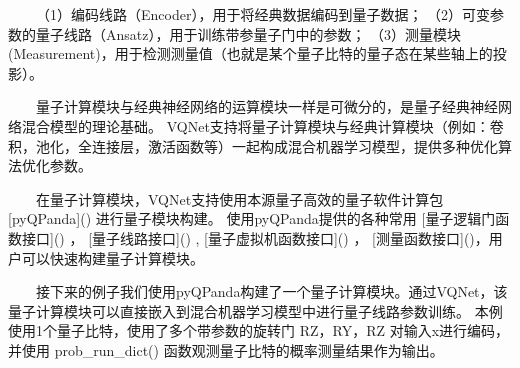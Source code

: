 \documentclass[a4paper,11pt,english]{sphinxmanual}
\let\sphinxpxdimen\pdfpxdimen\else\newdimen\sphinxpxdimen
\begin{document}
\sphinxAtStartPar
​  （1）编码线路（Encoder），用于将经典数据编码到量子数据； （2）可变参数的量子线路（Ansatz），用于训练带参量子门中的参数； （3）测量模块(Measurement)，用于检测测量值（也就是某个量子比特的量子态在某些轴上的投影）。

\sphinxAtStartPar
​  量子计算模块与经典神经网络的运算模块一样是可微分的，是量子经典神经网络混合模型的理论基础。 VQNet支持将量子计算模块与经典计算模块（例如：卷积，池化，全连接层，激活函数等）一起构成混合机器学习模型，提供多种优化算法优化参数。

\noindent{\hspace*{\fill}\sphinxincludegraphics[width=500\sphinxpxdimen]{{vqnet}.png}\hspace*{\fill}}

\sphinxAtStartPar
​  在量子计算模块，VQNet支持使用本源量子高效的量子软件计算包 {[}pyQPanda{]}() 进行量子模块构建。 使用pyQPanda提供的各种常用 {[}量子逻辑门函数接口{]}() ， {[}量子线路接口{]}() , {[}量子虚拟机函数接口{]}() ， {[}测量函数接口{]}()，用户可以快速构建量子计算模块。

\sphinxAtStartPar
​  接下来的例子我们使用pyQPanda构建了一个量子计算模块。通过VQNet，该量子计算模块可以直接嵌入到混合机器学习模型中进行量子线路参数训练。 本例使用1个量子比特，使用了多个带参数的旋转门 RZ，RY，RZ 对输入x进行编码，并使用 prob\_run\_dict() 函数观测量子比特的概率测量结果作为输出。
\end{document}
